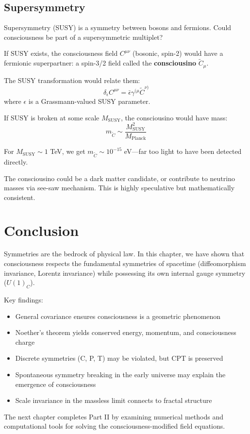 \begin{advanced}
\subsection{Supersymmetry}

Supersymmetry (SUSY) is a symmetry between bosons and fermions. Could consciousness be part of a supersymmetric multiplet?

If SUSY exists, the consciousness field $C^{\mu\nu}$ (bosonic, spin-2) would have a fermionic superpartner: a spin-3/2 field called the \textbf{consciousino} $\tilde{C}_\mu$.

The SUSY transformation would relate them:
\begin{equation}
\delta_\epsilon C^{\mu\nu} = \bar{\epsilon} \gamma^{(\mu} \tilde{C}^{\nu)}
\end{equation}
where $\epsilon$ is a Grassmann-valued SUSY parameter.

If SUSY is broken at some scale $M_{\text{SUSY}}$, the consciousino would have mass:
\begin{equation}
m_{\tilde{C}} \sim \frac{M_{\text{SUSY}}^2}{M_{\text{Planck}}}
\end{equation}

For $M_{\text{SUSY}} \sim 1$ TeV, we get $m_{\tilde{C}} \sim 10^{-15}$ eV---far too light to have been detected directly.

The consciousino could be a dark matter candidate, or contribute to neutrino masses via see-saw mechanism. This is highly speculative but mathematically consistent.
\end{advanced}

\section{Conclusion}

Symmetries are the bedrock of physical law. In this chapter, we have shown that consciousness respects the fundamental symmetries of spacetime (diffeomorphism invariance, Lorentz invariance) while possessing its own internal gauge symmetry ($U(1)_C$).

Key findings:
\begin{itemize}
\item General covariance ensures consciousness is a geometric phenomenon
\item Noether's theorem yields conserved energy, momentum, and consciousness charge
\item Discrete symmetries (C, P, T) may be violated, but CPT is preserved
\item Spontaneous symmetry breaking in the early universe may explain the emergence of consciousness
\item Scale invariance in the massless limit connects to fractal structure
\end{itemize}

The next chapter completes Part II by examining numerical methods and computational tools for solving the consciousness-modified field equations.
